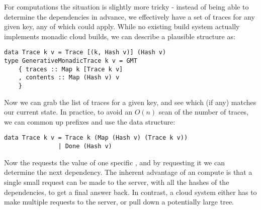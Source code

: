 For  computations the situation is slightly more tricky - instead of being able to determine the dependencies in advance, we effectively have a set of traces for any given key, any of which could apply. While no existing build system actually implements monadic cloud builds, we can describe a plausible structure as:

\begin{verbatim}
data Trace k v = Trace [(k, Hash v)] (Hash v)
type GenerativeMonadicTrace k v = GMT
    { traces :: Map k [Trace k v]
    , contents :: Map (Hash v) v
    }
\end{verbatim}

Now we can grab the list of traces for a given key, and see which (if any) matches our current state. In practice, to avoid an $O(n)$ scan of the number of traces, we can common up prefixes and use the data structure:

\begin{verbatim}
data Trace k v = Trace k (Map (Hash v) (Trace k v))
               | Done (Hash v)
\end{verbatim}

Now the  requests the value of one specific , and by requesting it we can determine the next dependency. The inherent advantage of an  compute is that a single small request can be made to the server, with all the hashes of the dependencies, to get a final answer back. In contrast, a  cloud system either has to make multiple requests to the server, or pull down a potentially large  tree.


